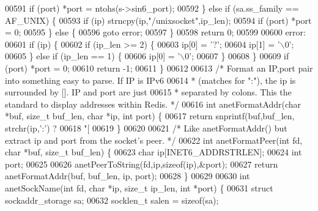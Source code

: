 \begin{DoxyCode}
{{{{{{{{{{{{{{{{{{{{{{{{{{00591         \textcolor{keywordflow}{if} (port) *port = ntohs(s->sin6\_port);
00592     \} \textcolor{keywordflow}{else} \textcolor{keywordflow}{if} (sa.ss\_family == AF\_UNIX) \{
00593         \textcolor{keywordflow}{if} (ip) strncpy(ip,\textcolor{stringliteral}{"/unixsocket"},ip\_len);
00594         \textcolor{keywordflow}{if} (port) *port = 0;
00595     \} \textcolor{keywordflow}{else} \{
00596         \textcolor{keywordflow}{goto} error;
00597     \}
00598     \textcolor{keywordflow}{return} 0;
00599 
00600 error:
00601     \textcolor{keywordflow}{if} (ip) \{
00602         \textcolor{keywordflow}{if} (ip\_len >= 2) \{
00603             ip[0] = \textcolor{stringliteral}{'?'};
00604             ip[1] = \textcolor{stringliteral}{'\(\backslash\)0'};
00605         \} \textcolor{keywordflow}{else} \textcolor{keywordflow}{if} (ip\_len == 1) \{
00606             ip[0] = \textcolor{stringliteral}{'\(\backslash\)0'};
00607         \}
00608     \}
00609     \textcolor{keywordflow}{if} (port) *port = 0;
00610     \textcolor{keywordflow}{return} -1;
00611 \}
00612 
00613 \textcolor{comment}{/* Format an IP,port pair into something easy to parse. If IP is IPv6}
00614 \textcolor{comment}{ * (matches for ":"), the ip is surrounded by []. IP and port are just}
00615 \textcolor{comment}{ * separated by colons. This the standard to display addresses within Redis. */}
00616 \textcolor{keywordtype}{int} anetFormatAddr(\textcolor{keywordtype}{char} *buf, size\_t buf\_len, \textcolor{keywordtype}{char} *ip, \textcolor{keywordtype}{int} port) \{
00617     \textcolor{keywordflow}{return} snprintf(buf,buf\_len, strchr(ip,\textcolor{stringliteral}{':'}) ?
00618            \textcolor{stringliteral}{"[%
00619 \}
00620 
00621 \textcolor{comment}{/* Like anetFormatAddr() but extract ip and port from the socket's peer. */}
00622 \textcolor{keywordtype}{int} anetFormatPeer(\textcolor{keywordtype}{int} fd, \textcolor{keywordtype}{char} *buf, size\_t buf\_len) \{
00623     \textcolor{keywordtype}{char} ip[INET6\_ADDRSTRLEN];
00624     \textcolor{keywordtype}{int} port;
00625 
00626     anetPeerToString(fd,ip,\textcolor{keyword}{sizeof}(ip),&port);
00627     \textcolor{keywordflow}{return} anetFormatAddr(buf, buf\_len, ip, port);
00628 \}
00629 
00630 \textcolor{keywordtype}{int} anetSockName(\textcolor{keywordtype}{int} fd, \textcolor{keywordtype}{char} *ip, size\_t ip\_len, \textcolor{keywordtype}{int} *port) \{
00631     \textcolor{keyword}{struct} sockaddr\_storage sa;
00632     socklen\_t salen = \textcolor{keyword}{sizeof}(sa);
}}}}}}}}}}}}}}}}}}}}}}}}}}}
\end{DoxyCode}
